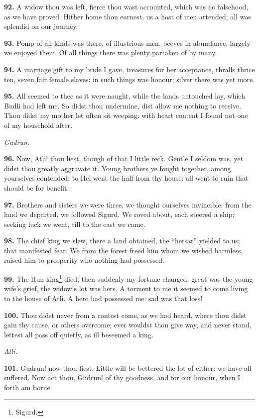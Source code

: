 \textbf{92.} A widow thou was left, fierce thou wast accounted, which was no
falsehood, as we have proved. Hither home thou earnest, us a host of
men attended; all was splendid on our journey.

\textbf{93.} Pomp of all kinds was there, of illustrious men, beeves in
abundance: largely we enjoyed them. Of all things there was plenty
partaken of by many.

\textbf{94.} A marriage gift to my bride I gave, treasures for her
acceptance, thralls thrice ten, seven fair female slaves: in such
things was honour; silver there was yet more.

\textbf{95.} All seemed to thee as it were naught, while the lands untouched
lay, which Budli had left me. So didst thou undermine, dist allow me
nothing to receive. Thou didst my mother let often sit weeping: with
heart content I found not one of my household after.

\emph{Gudrun.}

\textbf{96.} Now, Atli! thou liest, though of that I little reck. Gentle I
seldom was, yet didst thou greatly aggravate it. Young brothers ye
fought together, among yourselves contended; to Hel went the half from
thy house: all went to ruin that should be for benefit.

\textbf{97.} Brothers and sisters we were three, we thought ourselves
invincible: from the land we departed, we followed Sigurd. We roved
about, each steered a ship; seeking luck we went, till to the east we
came.

\textbf{98.} The chief king we slew, there a land obtained, the ``hersar''
yielded to us; that manifested fear. We from the forest freed him whom
we wished harmless, raised him to prosperity who nothing had
possessed.

\textbf{99.} The Hun king\footnote{Sigurd.} died, then suddenly my fortune changed: great
was the young wife's grief, the widow's lot was hers. A torment to me
it seemed to come living to the house of Atli. A hero had possessed
me: sad was that loss!

\textbf{100.} Thou didst never from a contest come, as we had heard, where
thou didst gain thy cause, or others overcome; ever wouldst thou give
way, and never stand, lettest all pass off quietly, as ill beseemed a
king.

\emph{Atli.}

\textbf{101.} Gudrun! now thou liest. Little will be bettered the lot of
either: we have all suffered. Now act thou, Gudrun! of thy goodness,
and for our honour, when I forth am borne.

